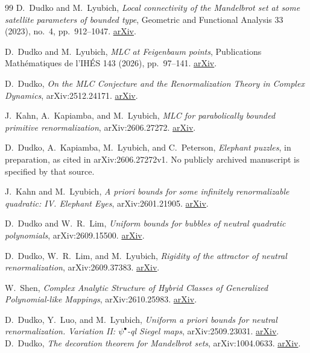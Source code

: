 \documentclass[11pt,a4paper,oneside,openany]{book}
\theoremstyle{definition}
\theoremstyle{remark}
\begin{document}
\begin{thebibliography}{99}
D.~Dudko and M.~Lyubich,
\emph{Local connectivity of the Mandelbrot set at some satellite parameters
of bounded type}, Geometric and Functional Analysis 33 (2023), no.~4,
pp.~912--1047.
\href{https://arxiv.org/abs/1808.10425}{arXiv}.

D.~Dudko and M.~Lyubich,
\emph{MLC at Feigenbaum points}, Publications Mathématiques de l'IHÉS 143
(2026), pp.~97--141.
\href{https://arxiv.org/abs/2309.02107}{arXiv}.

D.~Dudko,
\emph{On the MLC Conjecture and the Renormalization Theory in Complex
Dynamics}, arXiv:2512.24171.
\href{https://arxiv.org/abs/2512.24171}{arXiv}.

J.~Kahn, A.~Kapiamba, and M.~Lyubich,
\emph{MLC for parabolically bounded primitive renormalization},
arXiv:2606.27272.
\href{https://arxiv.org/abs/2606.27272}{arXiv}.

D.~Dudko, A.~Kapiamba, M.~Lyubich, and C.~Peterson,
\emph{Elephant puzzles}, in preparation, as cited in
arXiv:2606.27272v1.  No publicly archived manuscript is
specified by that source.

J.~Kahn and M.~Lyubich,
\emph{A priori bounds for some infinitely renormalizable quadratic: IV.
Elephant Eyes}, arXiv:2601.21905.
\href{https://arxiv.org/abs/2601.21905}{arXiv}.

D.~Dudko and W.~R.~Lim,
\emph{Uniform bounds for bubbles of neutral quadratic polynomials},
arXiv:2609.15500.
\href{https://arxiv.org/abs/2609.15500}{arXiv}.

D.~Dudko, W.~R.~Lim, and M.~Lyubich,
\emph{Rigidity of the attractor of neutral renormalization},
arXiv:2609.37383.
\href{https://arxiv.org/abs/2609.37383}{arXiv}.

W.~Shen,
\emph{Complex Analytic Structure of Hybrid Classes of Generalized
Polynomial-like Mappings}, arXiv:2610.25983.
\href{https://arxiv.org/abs/2610.25983}{arXiv}.

D.~Dudko, Y.~Luo, and M.~Lyubich,
\emph{Uniform a priori bounds for neutral renormalization. Variation II:
\(\psi^\bullet\)-ql Siegel maps}, arXiv:2509.23031.
\href{https://arxiv.org/abs/2509.23031}{arXiv}.
D.~Dudko, \emph{The decoration theorem for Mandelbrot sets}, arXiv:1004.0633.
\href{https://arxiv.org/abs/1004.0633}{arXiv}.


\end{thebibliography}
\end{document}
